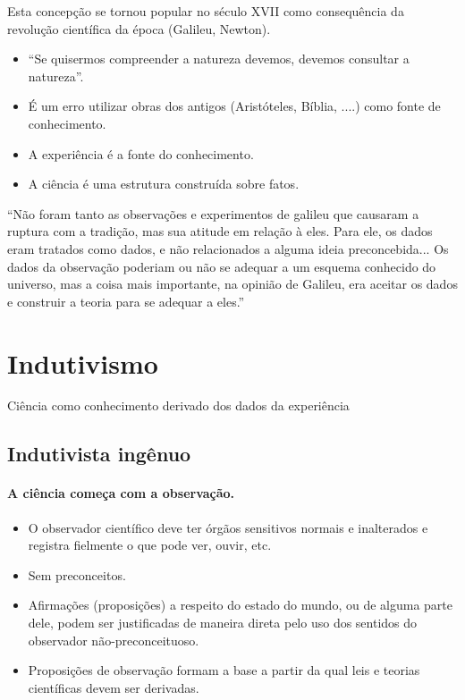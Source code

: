 \documentclass[9pt,a4paper]{extarticle}
\begin{document}
Esta concepção se tornou popular no século XVII como consequência da revolução científica da época (Galileu, Newton). 

\begin{itemize}
    \item ``Se quisermos compreender a natureza devemos, devemos consultar a natureza''.
    \item É um erro utilizar obras dos antigos (Aristóteles, Bíblia, ....) como fonte de conhecimento.
    \item A experiência é a fonte do conhecimento.
    \item A ciência é uma estrutura construída sobre fatos.
\end{itemize}

``Não foram tanto as observações e experimentos de galileu que causaram a ruptura com a tradição, mas sua atitude em relação à eles. Para ele, os dados eram tratados como dados, e não relacionados a alguma ideia preconcebida... Os dados da observação poderiam ou não se adequar a um esquema conhecido do universo, mas a coisa mais importante, na opinião de Galileu, era aceitar os dados e construir a teoria para se adequar a eles.'' \citep{anthony1957science}

\section{Indutivismo}

Ciência como conhecimento derivado dos dados da experiência

\subsection{Indutivista ingênuo}

\paragraph{A ciência começa com a observação.}
    \begin{itemize}
        \item O observador científico deve ter órgãos sensitivos normais e inalterados e registra fielmente o que pode ver, ouvir, etc.
        \item Sem preconceitos.
        \item Afirmações (proposições) a respeito do estado do mundo, ou de alguma parte dele, podem ser justificadas de maneira direta pelo uso dos sentidos do observador não-preconceituoso. 
        \item Proposições de observação formam a base a partir da qual leis e teorias científicas devem ser derivadas.
    \end{itemize}
\end{document}
